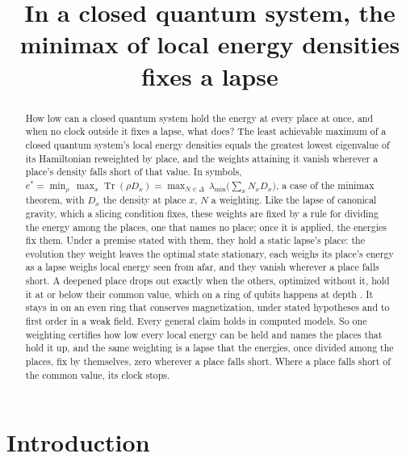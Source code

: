 \documentclass[aps,prd,reprint,superscriptaddress]{revtex4-2}
\begin{document}
\title{In a closed quantum system, the minimax of local energy densities fixes a lapse}


\begin{abstract}
How low can a closed quantum system hold the energy at every place at once, and when no clock outside it fixes a lapse, what does?
The least achievable maximum of a closed quantum system's local energy densities equals the greatest lowest eigenvalue of its Hamiltonian reweighted by place, and the weights attaining it vanish wherever a place's density falls short of that value.
In symbols, $e^* = \min_{\rho}\,\max_x \operatorname{Tr}(\rho D_x) = \max_{N\in\Delta}\,\lambda_{\min}\big(\sum_x N_x D_x\big)$, a case of the minimax theorem, with $D_x$ the density at place $x$, $N$ a weighting.
Like the lapse of canonical gravity, which a slicing condition fixes, these weights are fixed by a rule for dividing the energy among the places, one that names no place; once it is applied, the energies fix them.
Under a premise stated with them, they hold a static lapse's place: the evolution they weight leaves the optimal state stationary, each weighs its place's energy as a lapse weighs local energy seen from afar, and they vanish wherever a place falls short.
A deepened place drops out exactly when the others, optimized without it, hold it at or below their common value, which on a ring of  qubits happens at depth .
It stays in on an even ring that conserves magnetization, under stated hypotheses and to first order in a weak field.
Every general claim holds in  computed models.
So one weighting certifies how low every local energy can be held and names the places that hold it up, and the same weighting is a lapse that the energies, once divided among the places, fix by themselves, zero wherever a place falls short.
Where a place falls short of the common value, its clock stops.
\end{abstract}

\maketitle

\section{Introduction}
\label{sec:intro}
\end{document}
